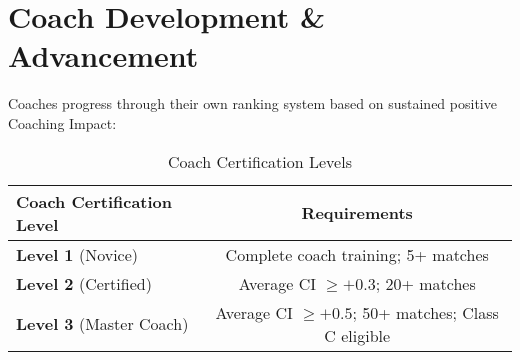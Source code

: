 \section{Coach Development \& Advancement}

Coaches progress through their own ranking system based on sustained positive Coaching Impact:

\begin{table}[h]
\centering
\begin{tabular}{@{}lc@{}}
\toprule
\textbf{Coach Certification Level} & \textbf{Requirements} \\ \midrule
\textbf{Level 1} (Novice) & Complete coach training; 5+ matches \\
\textbf{Level 2} (Certified) & Average CI $\geq +0.3$; 20+ matches \\
\textbf{Level 3} (Master Coach) & Average CI $\geq +0.5$; 50+ matches; Class C eligible \\ \bottomrule
\end{tabular}
\caption{Coach Certification Levels}
\label{tab:coach_certification}
\end{table}

